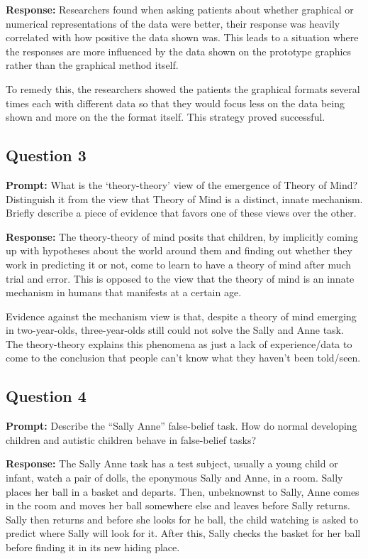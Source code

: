 \documentclass{article}
\begin{document}
\noindent\textbf{Response:} Researchers found when asking patients about whether graphical or numerical representations of the data were better, their response was heavily correlated with how positive the data shown was. This leads to a situation where the responses are more influenced by the data shown on the prototype graphics rather than the graphical method itself.

To remedy this, the researchers showed the patients the graphical formats several times each with different data so that they would focus less on the data being shown and more on the the format itself. This strategy proved successful.

\subsection*{Question 3}
\noindent\textbf{Prompt:} What is the `theory-theory' view of the emergence of Theory of Mind? Distinguish it from the view that Theory of Mind is a distinct, innate mechanism. Briefly describe a piece of evidence that favors one of these views over the other.
\bigskip

\noindent\textbf{Response:} The theory-theory of mind posits that children, by implicitly coming up with hypotheses about the world around them and finding out whether they work in predicting it or not, come to learn to have a theory of mind after much trial and error. This is opposed to the view that the theory of mind is an innate mechanism in humans that manifests at a certain age.

Evidence against the mechanism view is that, despite a theory of mind emerging in two-year-olds, three-year-olds still could not solve the Sally and Anne task. The theory-theory explains this phenomena as just a lack of experience/data to come to the conclusion that people can't know what they haven't been told/seen.

\subsection*{Question 4}
\noindent\textbf{Prompt:} Describe the ``Sally Anne'' false-belief task. How do normal developing children and autistic children behave in false-belief tasks?
\bigskip

\noindent\textbf{Response:} The Sally Anne task has a test subject, usually a young child or infant, watch a pair of dolls, the eponymous Sally and Anne, in a room. Sally places her ball in a basket and departs. Then, unbeknownst to Sally, Anne comes in the room and moves her ball somewhere else and leaves before Sally returns. Sally then returns and before she looks for he ball, the child watching is asked to predict where Sally will look for it. After this, Sally checks the basket for her ball before finding it in its new hiding place.
\end{document}

